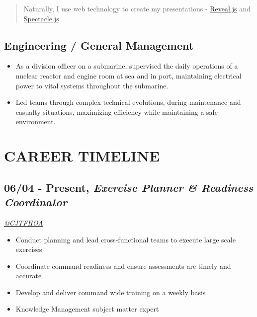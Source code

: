 \documentclass[10pt]{article}
\def\tightlist{}
\begin{document}
\begin{quote}
Naturally, I use web technology to create my presentations -
\href{https://revealjs.com/\#/}{Reveal.js} and
\href{https://formidable.com/open-source/spectacle/}{Spectacle.js}
\end{quote}

\hypertarget{engineering-general-management}{%
\subsection{Engineering / General
Management}\label{engineering-general-management}}

\begin{itemize}
\tightlist
\item
  As a division officer on a submarine, supervised the daily operations
  of a nuclear reactor and engine room at sea and in port, maintaining
  electrical power to vital systems throughout the submarine.
\item
  Led teams through complex technical evolutions, during maintenance and
  casualty situations, maximizing efficiency while maintaining a safe
  environment.
\end{itemize}

\hypertarget{career-timeline}{%
\section{CAREER TIMELINE}\label{career-timeline}}

\hypertarget{present-exercise-planner-readiness-coordinator}{%
\subsection{\texorpdfstring{06/04 - Present, \textbf{\emph{Exercise
Planner \& Readiness
Coordinator}}}{06/04 - Present, Exercise Planner \& Readiness Coordinator}}\label{present-exercise-planner-readiness-coordinator}}

\emph{\href{https://twitter.com/CJTFHOA}{@CJTFHOA}}

\begin{itemize}
\tightlist
\item
  Conduct planning and lead cross-functional teams to execute large
  scale exercises
\item
  Coordinate command readiness and ensure assessments are timely and
  accurate
\item
  Develop and deliver command wide training on a weekly basis
\item
  Knowledge Management subject matter expert
\end{itemize}
\end{document}

